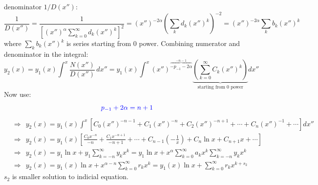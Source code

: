 \documentclass{article}
\begin{document}
\newpage

\noindent
denominator $1/D(x'')$:
\begin{equation}
    \frac{1}{D(x'')} = \frac{1}{\left[ (x'')^{\alpha} \sum_{k=0}^{\infty} d_k (x'')^k \right]^2} = (x'')^{-2\alpha} \left( \sum_k d_k (x'')^k \right)^{-2}
= (x'')^{-2\alpha} \sum_k b_k (x'')^k
\end{equation}
where $\sum_k b_k (x'')^k$ is series starting from 0 power. Combining numerator and denominator in the integral:
\begin{equation}
    y_2(x) = y_1(x) \int^x \frac{N(x'')}{D(x'')} \, dx''
= y_1(x) \int^x (x'')^{\overbrace{-p_{-1} - 2\alpha}^{-n-1}}
\underbrace{\left( \sum_{k=0}^{\infty} C_k (x'')^k \right)}_{\text{starting from 0 power}} dx''
\end{equation}
Now use:
\begin{equation}
    \color{blue} p_{-1} + 2\alpha = n+1 \color{black}
\end{equation}
\begin{align*}
    &\Rightarrow \ \ y_2(x) = y_1(x) \int^x \left[
C_0 (x'')^{-n-1} + C_1 (x'')^{-n} + C_2 (x'')^{-n+1}
+ \cdots + C_n (x'')^{-1} + \cdots
\right] dx'' \\ 
 &\Rightarrow \ \ y_2(x) = y_1(x) \left[
\frac{C_0 x^{-n}}{-n} + \frac{C_1 x^{-n+1}}{-n+1} + \cdots + C_{n-1} \left(-\frac{1}{x}\right)
+ C_n \ln x + C_{n+1} x + \cdots
\right]\\
&\Rightarrow \ \ y_2 (x) =  y_1 \ln x + y_1 \sum_{k=-n}^\infty y_k x^k 
= y_1 \ln x + x^\alpha \sum_{k=0}^\infty a_k x^k \sum_{k=-n}^\infty y_k x^k\\
&\Rightarrow \ \ y_2(x) = y_1(x) \ln x + x^{\alpha - n} \sum_{k=0}^\infty r_k x^k = y_1(x) \ln x + \sum_{k=0}^\infty r_k x^{k + s_2}
\end{align*}
$s_2$ is smaller solution to indicial equation.
\end{document}
